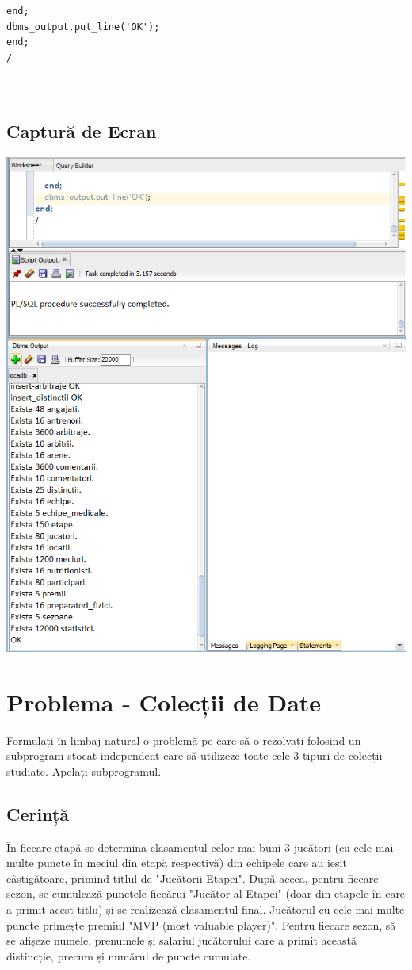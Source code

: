 \documentclass{article}
\begin{document}
\begin{multicols}{2}
\begin{lstlisting}
end;
dbms_output.put_line('OK');
end;
/



\end{lstlisting}
\end{multicols}
\subsection{Captură de Ecran}
\includegraphics[width=36em,keepaspectratio]{insert}
\pagebreak


\section{Problema - Colecții de Date}
	Formulați în limbaj natural o problemă pe care să o rezolvați folosind un subprogram stocat
	independent care să utilizeze toate cele 3 tipuri de colecții studiate. Apelați subprogramul.
	
\subsection{Cerință}
În fiecare etapă se determina clasamentul celor mai buni 3 jucători (cu cele mai multe puncte în meciul din etapă respectivă) din echipele care au ieșit câștigătoare, primind titlul de "Jucătorii Etapei". După aceea, pentru fiecare sezon, se cumulează punctele fiecărui "Jucător al Etapei" (doar din etapele în care a primit acest titlu) și se realizează clasamentul final. Jucătorul cu cele mai multe puncte primește premiul "MVP (most valuable player)".
Pentru fiecare sezon, să se afișeze numele, prenumele și salariul jucătorului care a primit această distincție, precum și numărul de puncte cumulate.
\end{document}
